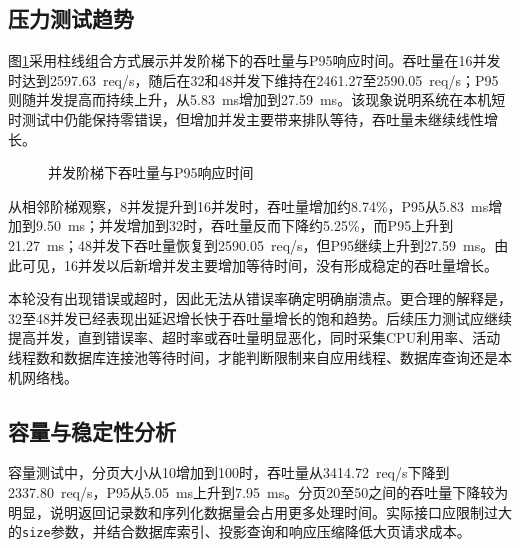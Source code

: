 \documentclass[bwprint]{report}
\begin{document}
\subsection{压力测试趋势}
图\ref{fig:stress-chart}采用柱线组合方式展示并发阶梯下的吞吐量与P95响应时间。吞吐量在16并发时达到2597.63~req/s，随后在32和48并发下维持在2461.27至2590.05~req/s；P95则随并发提高而持续上升，从5.83~ms增加到27.59~ms。该现象说明系统在本机短时测试中仍能保持零错误，但增加并发主要带来排队等待，吞吐量未继续线性增长。

\begin{figure}[H]
\centering
{}
\caption{并发阶梯下吞吐量与P95响应时间}
\label{fig:stress-chart}
\end{figure}

从相邻阶梯观察，8并发提升到16并发时，吞吐量增加约8.74\%，P95从5.83~ms增加到9.50~ms；并发增加到32时，吞吐量反而下降约5.25\%，而P95上升到21.27~ms；48并发下吞吐量恢复到2590.05~req/s，但P95继续上升到27.59~ms。由此可见，16并发以后新增并发主要增加等待时间，没有形成稳定的吞吐量增长。

本轮没有出现错误或超时，因此无法从错误率确定明确崩溃点。更合理的解释是，32至48并发已经表现出延迟增长快于吞吐量增长的饱和趋势。后续压力测试应继续提高并发，直到错误率、超时率或吞吐量明显恶化，同时采集CPU利用率、活动线程数和数据库连接池等待时间，才能判断限制来自应用线程、数据库查询还是本机网络栈。

\subsection{容量与稳定性分析}
容量测试中，分页大小从10增加到100时，吞吐量从3414.72~req/s下降到2337.80~req/s，P95从5.05~ms上升到7.95~ms。分页20至50之间的吞吐量下降较为明显，说明返回记录数和序列化数据量会占用更多处理时间。实际接口应限制过大的\texttt{size}参数，并结合数据库索引、投影查询和响应压缩降低大页请求成本。
\end{document}
